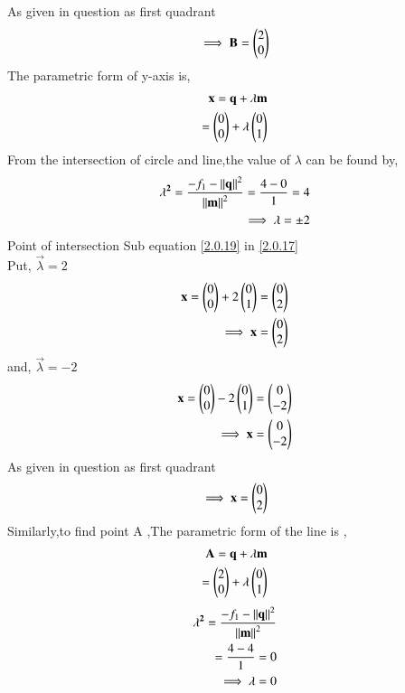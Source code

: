 \documentclass[journal,12pt,twocolumn]{IEEEtran}
\begin{document}
As given in question as first quadrant
\begin{align}
\implies \mathbf{B}=\begin{pmatrix}2\\0\end{pmatrix}   
\end{align}
The parametric form of y-axis is,
\begin{align}
\mathbf{x}=\mathbf{q}+\lambda \mathbf{m}\\
=\begin{pmatrix}0\\0\end{pmatrix}+\lambda \begin{pmatrix}0\\1\end{pmatrix} \label{2.0.17}
\end{align}
From the intersection of circle and line,the value of $\lambda$ can be found by,
\begin{align}
\mathbf{\lambda^2}=\frac{{{-f_1}-\left\lVert\mathbf{q}\right\rVert^2 }}{{\left\lVert\mathbf{m}\right\rVert^2}}=\frac{{{4}-{0} }}{{ {1 }}}=4
\\
\implies \mathbf{\lambda}=\pm{2} \label{2.0.19}
\end{align}
 Point of intersection
Sub equation \eqref{2.0.19} in \eqref{2.0.17}
\\
Put, $\vec{\lambda}= 2$
\begin{align}
\mathbf{x}=\begin{pmatrix}0\\0\end{pmatrix}+2\begin{pmatrix}0\\ 1\end{pmatrix}=\begin{pmatrix}0 \\ 2\end{pmatrix}
\\ 
\implies\mathbf{x}=\begin{pmatrix}0\\2\end{pmatrix}
\end{align}
and, $\vec{\lambda}=-2$
\begin{align}
\mathbf{x}=\begin{pmatrix}0 \\0\end{pmatrix}-2\begin{pmatrix}0\\1\end{pmatrix}=\begin{pmatrix}0 \\ -2\end{pmatrix}
\\ 
\implies\mathbf{x}=\begin{pmatrix}0\\ -2\end{pmatrix}
\end{align}
As given in question as first quadrant
\begin{align}
\implies \mathbf{x}=\begin{pmatrix}0 \\ 2\end{pmatrix}   
\end{align}
Similarly,to find point A ,The parametric form of the line is ,
\begin{align}
 \mathbf{A}=\mathbf{q}+\lambda \mathbf{m}\\ =\begin{pmatrix}2\\0\end{pmatrix}+\lambda \begin{pmatrix}0\\1\end{pmatrix} \label{2.0.26}
\end{align}
\begin{align}
 \mathbf{\lambda^2}=\frac{{{-f_1}-\left\lVert\mathbf{q}\right\rVert^2}}{{\left\lVert\mathbf{m}\right\rVert^2}}\\=\frac{{{4}-{4}}}{{{1}}}=0
 \\
\implies \lambda=0 \label{2.0.29}
\end{align}
\end{document}
